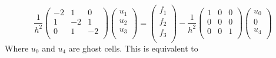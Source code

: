 \documentclass[11pt]{article}
\begin{document}
\begin{equation}
\frac{1}{h^2}
 \begin{pmatrix}
  -2 &  1 &  0 \\
   1 & -2 &  1 \\
   0 &  1 & -2 \\
 \end{pmatrix}
 \begin{pmatrix}
  u_1 \\  u_2 \\  u_3 \\
 \end{pmatrix}
  = 
 \begin{pmatrix}
  f_1 \\  f_2 \\  f_3 \\
 \end{pmatrix}
   -
\frac{1}{h^2}
 \begin{pmatrix}
   1 &  0 &  0 \\
   0 &  0 &  0 \\
   0 &  0 &  1 \\
 \end{pmatrix}
 \begin{pmatrix}
  u_0 \\
  0 \\
  u_4 \\
 \end{pmatrix}
\end{equation}
Where $u_0$ and $u_4$ are ghost cells. This is equivalent to
\end{document}
